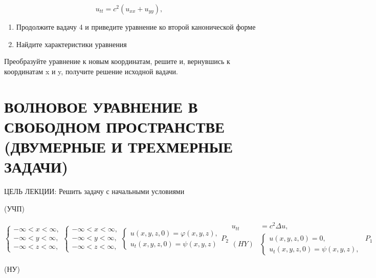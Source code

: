 \documentclass[
  ukrainian,
]{article}
\begin{document}
\[
u_{tt} = c^2 (u_{xx} + u_{yy}), \quad
\]

\begin{enumerate}
\def\labelenumi{\arabic{enumi}.}
\setcounter{enumi}{4}
\item
  Продолжите вадачу 4 и приведите уравнение ко второй канонической форме
\item
  Найдите характеристики уравнения
\end{enumerate}

Преобразуйте уравнение к новым координатам, решите и, вернувшись к
координатам x и y, получите решение исходной вадачи.

\section{ВОЛНОВОЕ УРАВНЕНИЕ В СВОБОДНОМ ПРОСТРАНСТВЕ (ДВУМЕРНЫЕ И
ТРЕХМЕРНЫЕ
ЗАДАЧИ)}\label{ux432ux43eux43bux43dux43eux432ux43eux435-ux443ux440ux430ux432ux43dux435ux43dux438ux435-ux432-ux441ux432ux43eux431ux43eux434ux43dux43eux43c-ux43fux440ux43eux441ux442ux440ux430ux43dux441ux442ux432ux435-ux434ux432ux443ux43cux435ux440ux43dux44bux435-ux438-ux442ux440ux435ux445ux43cux435ux440ux43dux44bux435-ux437ux430ux434ux430ux447ux438}

ЦЕЛЬ ЛЕКЦИИ: Решить задачу с начальными условиями

(УЧП)

\[
\begin{cases} -\infty < x < \infty, \\ -\infty < y < \infty, \\ -\infty < z < \infty, \end{cases}
\begin{cases} -\infty < x < \infty, \\ -\infty < y < \infty, \\ -\infty < z < \infty, \end{cases}
\begin{cases} u(x, y, z, 0) = \varphi(x, y, z), \\ u_{t}(x, y, z, 0) = \psi(x, y, z) \end{cases}
P_{2}
\begin{aligned} u_{tt} &= c^2 \Delta u, \\ (HY) & \begin{cases} u(x, y, z, 0) = 0, \\ u_t(x, y, z, 0) = \psi(x, y, z), \end{cases} \end{aligned}
P_{1}
\]

(НУ)
\end{document}
